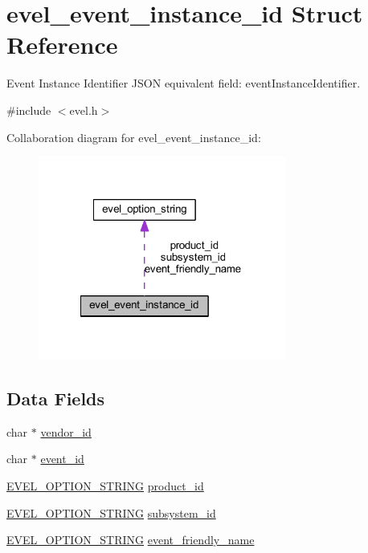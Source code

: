 \hypertarget{structevel__event__instance__id}{}\section{evel\+\_\+event\+\_\+instance\+\_\+id Struct Reference}
\label{structevel__event__instance__id}


Event Instance Identifier J\+S\+ON equivalent field\+: event\+Instance\+Identifier.  




{\ttfamily \#include $<$evel.\+h$>$}



Collaboration diagram for evel\+\_\+event\+\_\+instance\+\_\+id\+:
\nopagebreak
\begin{figure}[H]
\begin{center}
\leavevmode
\includegraphics[width=230pt]{structevel__event__instance__id__coll__graph}
\end{center}
\end{figure}
\subsection*{Data Fields}
\begin{DoxyCompactItemize}
\item 
char $\ast$ \hyperlink{structevel__event__instance__id_a6a15043bb2ff4df078e6a958b628e87a}{vendor\+\_\+id}
\item 
char $\ast$ \hyperlink{structevel__event__instance__id_a1dc44f941b58ed99cf763002fdb0efd1}{event\+\_\+id}
\item 
\hyperlink{evel_8h_a0de5113a7b72de93c0c7b644f7ea7ec3}{E\+V\+E\+L\+\_\+\+O\+P\+T\+I\+O\+N\+\_\+\+S\+T\+R\+I\+NG} \hyperlink{structevel__event__instance__id_ae5220d3ebf64d4f3b7e3199bc5a56126}{product\+\_\+id}
\item 
\hyperlink{evel_8h_a0de5113a7b72de93c0c7b644f7ea7ec3}{E\+V\+E\+L\+\_\+\+O\+P\+T\+I\+O\+N\+\_\+\+S\+T\+R\+I\+NG} \hyperlink{structevel__event__instance__id_a7647656f3b31ad441a4032796ef9144a}{subsystem\+\_\+id}
\item 
\hyperlink{evel_8h_a0de5113a7b72de93c0c7b644f7ea7ec3}{E\+V\+E\+L\+\_\+\+O\+P\+T\+I\+O\+N\+\_\+\+S\+T\+R\+I\+NG} \hyperlink{structevel__event__instance__id_ad6140447ce4f6f19f037238ded4dc677}{event\+\_\+friendly\+\_\+name}
\end{DoxyCompactItemize}


